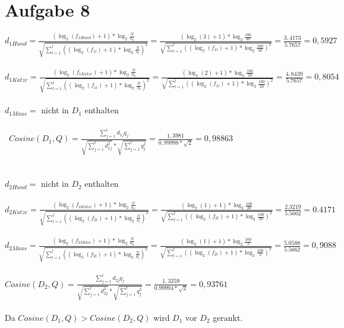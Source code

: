 \section*{Aufgabe 8}

$d_{1Hund} =\frac{(\log_{2}(f_{1Hund}) + 1) * \log_{2}\frac{N}{n_{k}}}{\sqrt{\sum_{l=1}^{t}((\log_{2}(f_{1l}) + 1) * \log_{2} \frac{N}{n_{l}})^{2}}} = \frac{(\log_{2}(3) + 1) * \log_{2}\frac{100}{40}}{\sqrt{\sum_{l=1}^{t}((\log_{2}(f_{1l}) + 1) * \log_{2} \frac{100}{40})^{2}}} = \frac{3,4173}{5.7657} = 0,5927$ \\
\ \\
$d_{1Katze} =\frac{(\log_{2}(f_{1Katze}) + 1) * \log_{2}\frac{N}{n_{k}}}{\sqrt{\sum_{l=1}^{t}((\log_{2}(f_{1l}) + 1) * \log_{2} \frac{N}{N_{l}})^{2}}} = \frac{(\log_{2}(2) + 1) * \log_{2}\frac{100}{20}}{\sqrt{\sum_{l=1}^{t}((\log_{2}(f_{1l}) + 1) * \log_{2} \frac{100}{20})^{2}}} = \frac{4,6439}{5.7657} = 0,8054$ \\
\ \\
$d_{1Maus} =$ nicht in $D_{1}$ enthalten \\
\\ \
$Cosine(D_{1}, Q) = \frac{\sum_{j=1}^{t}d_{1j}q_{j}}{\sqrt{\sum_{j=1}^{t}d_{1j}^{2}} * \sqrt{\sum_{j=1}^{t}q_{j}^{2}}} = \frac{1,3981}{0,99998 * \sqrt{2}} = 0,98863$ \\
\ \\
\ \\
$d_{2Hund} =$ nicht in $D_{2}$ enthalten \\
\ \\
$d_{2Katze} =\frac{(\log_{2}(f_{2Katze}) + 1) * \log_{2}\frac{N}{n_{k}}}{\sqrt{\sum_{l=1}^{t}((\log_{2}(f_{2l}) + 1) * \log_{2} \frac{N}{n_{l}})^{2}}} = \frac{(\log_{2}(1) + 1) * \log_{2}\frac{100}{20}}{\sqrt{\sum_{l=1}^{t}((\log_{2}(f_{2l}) + 1) * \log_{2} \frac{100}{20})^{2}}} = \frac{2.3219}{5.5662} = 0.4171$ \\
\ \\ 
$d_{2Maus} =\frac{(\log_{2}(f_{2Maus}) + 1) * \log_{2}\frac{N}{n_{k}}}{\sqrt{\sum_{l=1}^{t}((\log_{2}(f_{2l}) + 1) * \log_{2} \frac{N}{n_{l}})^{2}}} = \frac{(\log_{2}(1) + 1) * \log_{2}\frac{100}{3}}{\sqrt{\sum_{l=1}^{t}((\log_{2}(f_{2l}) + 1) * \log_{2} \frac{100}{3})^{2}}} =\frac{5.0588}{5.5662} = 0,9088$ \\
\ \\
$Cosine(D_{2}, Q) = \frac{\sum_{j=1}^{t}d_{2j}q_{j}}{\sqrt{\sum_{j=1}^{t}d_{2j}^{2}} * \sqrt{\sum_{j=1}^{t}q_{j}^{2}}} = \frac{1,3259}{0.99994 * \sqrt{2}} = 0,93761$\\
\ \\
Da $Cosine(D_{1}, Q) > Cosine(D_{2}, Q)$ wird $D_{1}$ vor $D_{2}$ gerankt.